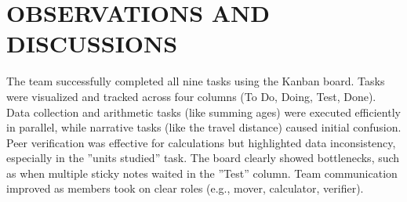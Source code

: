 \chapter{OBSERVATIONS AND DISCUSSIONS}\label{ch:experimental_result}
The team successfully completed all nine tasks using the Kanban board. Tasks were
visualized and tracked across four columns (To Do, Doing, Test, Done). Data collection
and arithmetic tasks (like summing ages) were executed efficiently in parallel, while
narrative tasks (like the travel distance) caused initial confusion. Peer verification was
effective for calculations but highlighted data inconsistency, especially in the ”units
studied” task. The board clearly showed bottlenecks, such as when multiple sticky
notes waited in the ”Test” column. Team communication improved as members took
on clear roles (e.g., mover, calculator, verifier).
